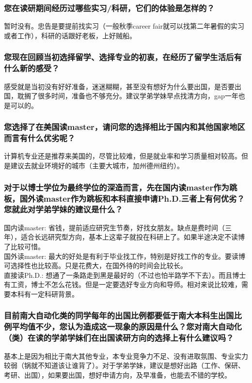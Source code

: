 \documentclass[a4paper,UTF8]{book}
\begin{document}
    \subsubsection*{您在读研期间经历过哪些实习/科研，它们的体验是怎样的？}
    暂时没有。忠告是要提前找实习（一般秋季career fair就可以找第二年暑假的实习或者工作），科研的话跟好老板，上好贼船。

    \subsubsection*{您现在回顾当初选择留学、选择专业的初衷，在经历了留学生活后有什么新的感受？}
    感受就是当初没有好好准备，迷迷糊糊，甚至没有想好为什么要出国，是否要出国，耽搁了很多时间，准备也不够充分。建议学弟学妹早点找清方向，gap一年也是可以的。

    \subsubsection*{您选择了在美国读master，请问您的选择相比于国内和其他国家地区而言有什么优劣呢？}
    计算机专业还是推荐来美国的，尽管比较难，但是就业率和学习质量相对较高。但是建议去就业环境好的城市（主要大城市，加州德州纽约）。

    \subsubsection*{对于以博士学位为最终学位的深造而言，先在国内读master作为跳板，国外读master作为跳板和本科直接申请Ph.D.三者上有何优劣？您就此对学弟学妹的建议是什么？}
    国内读master: 省钱，提前适应研究生节奏，好找女朋友。缺点是费时间（三年），适合长远研究型方向，基本上这辈子就投在科研上了。如果半途决定不读博了比较可惜。\\
    国外读master: 最大的好处是有利于毕业找工作，特别是好找工作的专业。要读博可选择性也比较高。只是花费大，在国外待的时间会比较长。\\
    直接读Ph.D.: 想通了一条路走到黑是最好的（不过也怕半路学不下去）。而且博士有工资，博士不怎么花钱。但是一定要选好专业方向和导师。相对来说比较难，需要本科有一定科研背景。

    \subsubsection*{目前南大自动化类的同学每年的出国比例都要低于南大本科生出国比例平均值不少，您认为造成这一现象的原因是什么？您对南大自动化（类）在读的学弟学妹们在出国读研方向的选择上有什么建议吗？}
    基本上是因为相比于南大其他专业，本专业竞争力不足、没有进取氛围、专业实力较弱（锅就不知道该让谁背了）。对于学弟学妹，建议是想好出路（工作、保研、考研、出国），如果要出国，想好申请方向，及早准备，也能去不错的学校。
\end{document}
